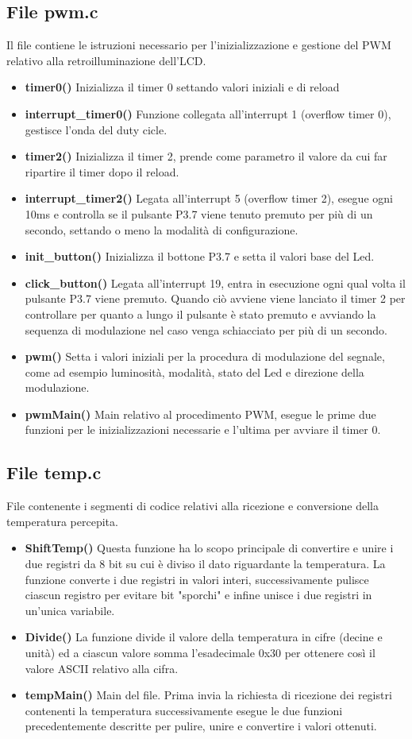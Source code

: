 \documentclass[11pt]{article}
\begin{document}
\subsection*{File pwm.c}
Il file contiene le istruzioni necessario per l'inizializzazione e gestione del PWM relativo alla retroilluminazione dell'LCD.
\begin{itemize}
\item \textbf{timer0()} Inizializza il timer 0 settando valori iniziali e di reload
\item \textbf{interrupt\_timer0()} Funzione collegata all'interrupt 1 (overflow timer 0), gestisce l'onda del duty cicle.
\item \textbf{timer2()} Inizializza il timer 2, prende come parametro il valore da cui far ripartire il timer dopo il reload.
\item \textbf{interrupt\_timer2()} Legata all'interrupt 5 (overflow timer 2), esegue ogni 10ms e controlla se il pulsante P3.7 viene tenuto premuto per più di un secondo, settando o meno la modalità di configurazione.
\item \textbf{init\_button()} Inizializza il bottone P3.7 e setta il valori base del Led.
\item \textbf{click\_button()} Legata all'interrupt 19, entra in esecuzione ogni qual volta il pulsante P3.7 viene premuto. Quando ciò avviene viene lanciato il timer 2 per controllare per quanto a lungo il pulsante è stato premuto e avviando la sequenza di modulazione nel caso venga schiacciato per più di un secondo.
\item \textbf{pwm()} Setta i valori iniziali per la procedura di modulazione del segnale, come ad esempio luminosità, modalità, stato del Led e direzione della modulazione.
\item \textbf{pwmMain()} Main relativo al procedimento PWM, esegue le prime due funzioni per le inizializzazioni necessarie e l'ultima per avviare il timer 0.
\end{itemize}

\subsection*{File temp.c}
File contenente i segmenti di codice relativi alla ricezione e conversione della temperatura percepita.
\begin{itemize}
\item \textbf{ShiftTemp()} Questa funzione ha lo scopo principale di convertire e unire i due registri da 8 bit su cui è diviso il dato riguardante la temperatura. La funzione converte i due registri in valori interi, successivamente pulisce ciascun registro per evitare bit "sporchi" e infine unisce i due registri in un'unica variabile.
\item \textbf{Divide()} La funzione divide il valore della temperatura in cifre (decine e unità) ed a ciascun valore somma l'esadecimale 0x30 per ottenere così il valore ASCII relativo alla cifra.
\item \textbf{tempMain()} Main del file. Prima invia la richiesta di ricezione dei registri contenenti la temperatura successivamente esegue le due funzioni precedentemente descritte per pulire, unire e convertire i valori ottenuti.
\end{itemize}
\end{document}
